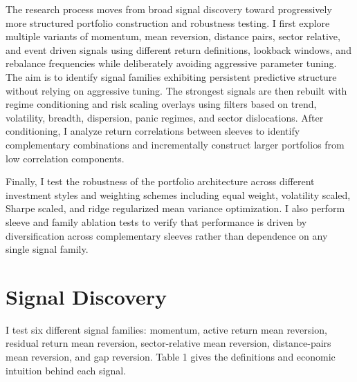\documentclass{article}
\begin{document}
The research process moves from broad signal discovery toward progressively more structured portfolio construction and robustness testing. I first explore multiple variants of momentum, mean reversion, distance pairs, sector relative, and event driven signals using different return definitions, lookback windows, and rebalance frequencies while deliberately avoiding aggressive parameter tuning. The aim is to identify signal families exhibiting persistent predictive structure without relying on aggressive tuning. The strongest signals are then rebuilt with regime conditioning and risk scaling overlays using filters based on trend, volatility, breadth, dispersion, panic regimes, and sector dislocations. After conditioning, I analyze return correlations between sleeves to identify complementary combinations and incrementally construct larger portfolios from low correlation components.

Finally, I test the robustness of the portfolio architecture across different investment styles and weighting schemes including equal weight, volatility scaled, Sharpe scaled, and ridge regularized mean variance optimization. I also perform sleeve and family ablation tests to verify that performance is driven by diversification across complementary sleeves rather than dependence on any single signal family.

\section{Signal Discovery}
I test six different signal families: momentum, active return mean reversion, residual return mean reversion, sector-relative mean reversion, distance-pairs mean reversion, and gap reversion. Table 1 gives the definitions and economic intuition behind each signal.
\end{document}
